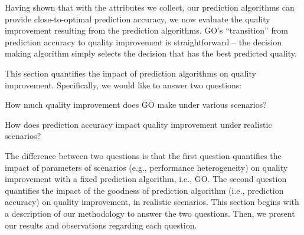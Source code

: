 \label{improvement}
Having shown that with the attributes we collect, our prediction algorithms can provide close-to-optimal prediction accuracy, we now evaluate the quality improvement resulting from the prediction algorithms. GO's ``transition'' from prediction accuracy to quality improvement is straightforward -- the decision making algorithm simply selects the decision that has the best predicted quality. 

This section quantifies the impact of prediction algorithms on quality improvement. Specifically, we would like to answer two questions:
\begin{packedenumerate}
	\item How much quality improvement does GO make under various scenarios?
	\item How does prediction accuracy impact quality improvement under realistic scenarios?
\end{packedenumerate}

The difference between two questions is that the first question quantifies the impact of parameters of scenarios (e.g., performance heterogeneity) on quality improvement with a fixed prediction algorithm, i.e., GO. The second question quantifies the impact of the goodness of prediction algorithm (i.e., prediction accuracy) on quality improvement, in realistic scenarios. This section begins with a description of our methodology to answer the two questions. Then, we present our results and observations regarding each question.


